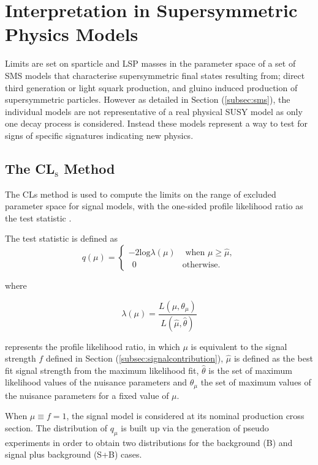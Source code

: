 \section{Interpretation in Supersymmetric Physics Models}
\label{sec:resultsms}

Limits are set on sparticle and \ac{LSP} masses in the parameter space of a set of \ac{SMS} models that characterise supersymmetric final states resulting from; direct third generation or light squark production, and gluino induced production of supersymmetric particles. However as detailed in Section (\ref{subsec:sms}), the individual models are not representative of a real physical \ac{SUSY} model as only one decay process is considered. Instead these models represent a way to test for signs of specific signatures indicating new physics. 

\subsection{The CL$_{\text{s}}$ Method}

The CLs method \cite{0954-3899-28-10-313}\cite{Junk1999435}\cite{Read:451614} is used to compute the limits on the range of excluded parameter space for signal models, with the one-sided profile likelihood ratio as the test statistic \cite{asymptotictest}.

The test statistic is defined as
\begin{equation}
  q(\mu)=\begin{cases}
    -2\text{log}\lambda(\mu) & \text{ when $\mu \geq \hat{\mu}$},\\
      \ \ 0 & \text{otherwise}.
  \end{cases}
\end{equation}

where 

\begin{equation}
\lambda(\mu) = \frac{L(\mu,\theta_{\mu})}{L(\hat{\mu},\hat{\theta})}
\end{equation}

represents the profile likelihood ratio, in which $\mu$ is equivalent to the signal strength $f$ defined in Section (\ref{subsec:signalcontribution}), $\hat{\mu}$ is defined as the best fit signal strength from the maximum likelihood fit, $\hat{\theta}$ is the set of maximum likelihood values of the nuisance parameters and $\theta_{\mu}$ the set of maximum values of the nuisance parameters for a fixed value of $\mu$.

When $\mu \equiv f = 1$, the signal model is considered at its nominal production cross section. The distribution of $q_{\mu}$ is built up via the generation of pseudo experiments in order to obtain two distributions for the background (B) and signal plus background (S+B) cases.

